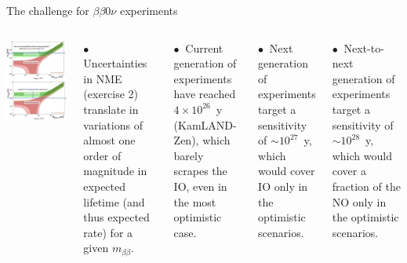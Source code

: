 \documentclass [aspectratio=169]{beamer}
\begin{document}
\begin{frame}{The challenge for $\beta\beta0\nu$ experiments}

\begin{columns}
\includegraphics[scale=0.25]{landscapes.png}

$\bullet~$ Uncertainties in NME (exercise 2) translate in variations of almost one order of magnitude in expected lifetime (and thus expected rate) for a given $m_{\beta\beta}$. 

$\bullet~$ Current generation of experiments have reached $4 \times 10^{26}$~y (KamLAND-Zen), which barely scrapes the IO, even in the most optimistic case. 

$\bullet~$ Next generation of experiments target a sensitivity of $\sim 10^{27}$~y, which would cover IO only in the optimistic scenarios. 

$\bullet~$ Next-to-next generation of experiments target a sensitivity of $\sim 10^{28}$~y, which would cover a fraction of the NO only in the optimistic scenarios. 
\end{columns}
\end{frame}
\end{document}
